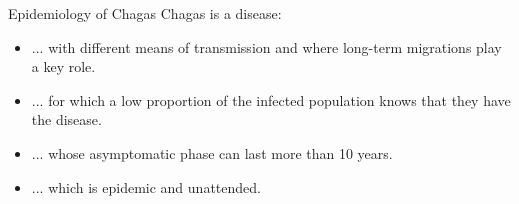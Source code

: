 \documentclass{beamer}
\begin{document}
\begin{frame}{Epidemiology of Chagas}
	Chagas is a disease:
	\begin{itemize}
		\item ... with different means of transmission and where long-term migrations play a key role. %
		\item ... for which a low proportion of the infected population knows that they have the disease.
		\item ... whose asymptomatic phase can last more than 10 years.
		\item ... which is epidemic and unattended.		 
	\end{itemize}
\end{frame}


%	
%	
%	
%	
%	
%	
\end{document}
